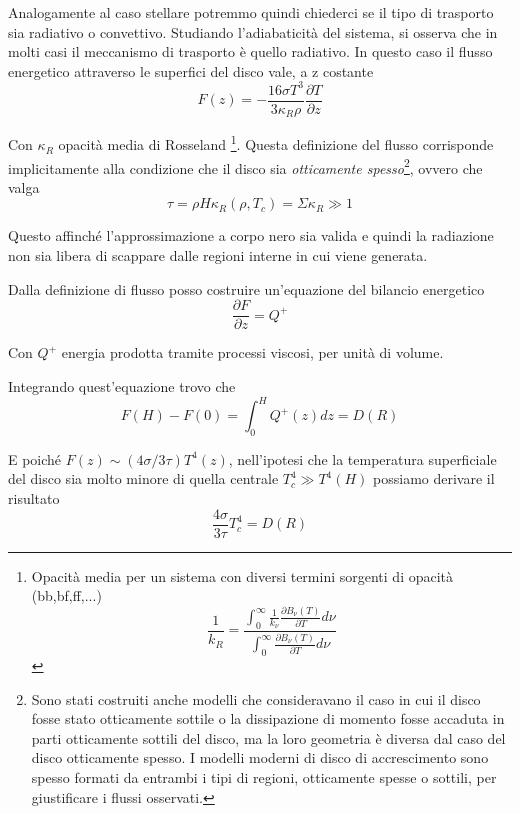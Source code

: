 \documentclass[a4paperbi]{article}
\begin{document}
	Analogamente al caso stellare potremmo quindi chiederci se il tipo di trasporto sia  radiativo o convettivo. Studiando l'adiabaticità del sistema, si osserva che in molti casi il meccanismo di trasporto è quello radiativo. In questo caso il flusso energetico attraverso le superfici del disco vale, a z costante
	\begin{equation}
		F(z)=-\frac{16\sigma T^3}{3\kappa_R\rho}\frac{\partial T}{\partial z}
	\end{equation}
	
	Con $\kappa_R$ opacità media di Rosseland
	\footnote{Opacità media per un sistema con diversi termini sorgenti di opacità (bb,bf,ff,...)\begin{equation}
																							\frac{1}{k_R}=\frac{\int_0^\infty\frac{1}{k_\nu}\frac{\partial B_\nu(T)}{\partial T}d\nu}{\int_0^\infty\frac{\partial B_\nu(T)}{\partial T}d\nu}
																						\end{equation}}.
Questa definizione del flusso corrisponde implicitamente alla condizione che il disco sia \textit{otticamente spesso}\footnote{Sono stati costruiti anche modelli che consideravano il caso in cui il disco fosse stato otticamente sottile o la dissipazione di momento fosse accaduta in parti otticamente sottili del disco, ma la loro geometria è diversa dal caso del disco otticamente spesso. I modelli moderni di disco di accrescimento sono spesso formati da entrambi i tipi di regioni, otticamente spesse o sottili, per giustificare i flussi osservati.}, ovvero che valga
	\begin{equation}
		\tau=\rho H\kappa_R(\rho,T_c)=\Sigma\kappa_R\gg 1
	\end{equation}
	
	Questo affinché l'approssimazione a corpo nero sia valida e quindi la radiazione non sia libera di scappare dalle regioni interne in cui viene generata.
	
	Dalla definizione di flusso posso costruire un'equazione del bilancio energetico
	\begin{equation}
		\frac{\partial F}{\partial z}=Q^+
	\end{equation}

	Con $Q^+$ energia prodotta tramite processi viscosi, per unità di volume.
	
	Integrando quest'equazione trovo che
	\begin{equation}
		F(H)-F(0)=\int_0^HQ^+(z)dz=D(R)
	\end{equation}

	E poiché $F(z)\sim(4\sigma/3\tau)T^4(z)$, nell'ipotesi che la temperatura superficiale del disco sia molto minore di quella centrale $T_c^4\gg T^4(H)$
	possiamo derivare il risultato
	\begin{equation}
		\frac{4\sigma}{3\tau}T^4_c=D(R)
	\end{equation}
	
\end{document}
